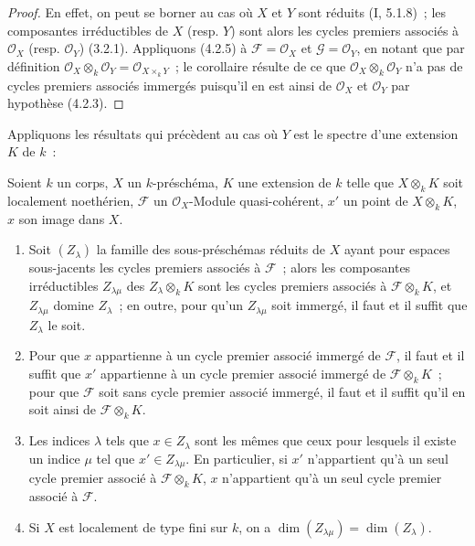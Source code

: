 \begin{proof}
En effet, on peut se borner au cas où $X$ et $Y$ sont réduits (I, 5.1.8)~; les
composantes irréductibles de $X$ (resp. $Y$) sont alors les cycles premiers
associés à $\mathcal O_X$ (resp. $\mathcal O_Y$) (3.2.1). Appliquons (4.2.5)
à $\mathcal F=\mathcal O_X$ et $\mathcal G=\mathcal O_Y$, en notant que par
définition $\mathcal O_X\otimes_k\mathcal O_Y=\mathcal O_{X\times_k Y}$~; le
corollaire résulte de ce que $\mathcal O_X\otimes_k\mathcal O_Y$ n'a pas de
cycles premiers associés immergés puisqu'il en est ainsi de $\mathcal O_X$ et
$\mathcal O_Y$ par hypothèse (4.2.3).
\end{proof}

Appliquons les résultats qui précèdent au cas où $Y$ est le spectre d'une
extension $K$ de $k$~:

\begin{proposition}[4.2.7]
\label{IV.2.4.2.7-fr}
Soient $k$ un corps, $X$ un $k$-préschéma, $K$ une extension de $k$ telle que
$X\otimes_k K$ soit localement noethérien, $\mathcal F$ un
$\mathcal O_X$-Module quasi-cohérent, $x'$ un point de $X\otimes_k K$, $x$
son image dans $X$.
\begin{enumerate}
\item[(i)] Soit $(Z_\lambda)$ la famille des sous-préschémas réduits de $X$
ayant pour espaces sous-jacents les cycles premiers associés à $\mathcal F$~;
alors les composantes irréductibles $Z_{\lambda\mu}$ des
$Z_\lambda\otimes_k K$ sont les cycles premiers associés à
$\mathcal F\otimes_k K$, et $Z_{\lambda\mu}$ domine $Z_\lambda$~; en outre,
pour qu'un $Z_{\lambda\mu}$ soit immergé, il faut et il suffit que $Z_\lambda$
le soit.
\item[(ii)] Pour que $x$ appartienne à un cycle premier associé immergé de
$\mathcal F$, il faut et il suffit que $x'$ appartienne à un cycle premier
associé immergé de $\mathcal F\otimes_k K$~; pour que $\mathcal F$ soit sans
cycle premier associé immergé, il faut et il suffit qu'il en soit ainsi de
$\mathcal F\otimes_k K$.


\item[(iii)] Les indices $\lambda$ tels que $x\in Z_\lambda$ sont les mêmes
que ceux pour lesquels il existe un indice $\mu$ tel que
$x'\in Z_{\lambda\mu}$. En particulier, si $x'$ n'appartient qu'à un seul
cycle premier associé à $\mathcal F\otimes_k K$, $x$ n'appartient qu'à un
seul cycle premier associé à $\mathcal F$.
\item[(iv)] Si $X$ est localement de type fini sur $k$, on a
$\dim(Z_{\lambda\mu})=\dim(Z_\lambda)$.
\end{enumerate}
\end{proposition}

